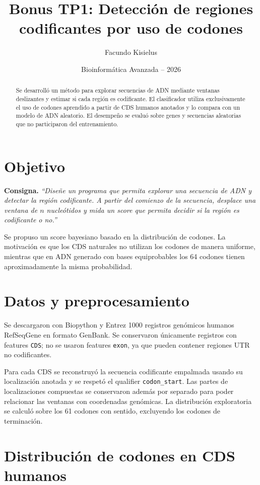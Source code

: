 \documentclass[11pt,a4paper]{article}
\title{Bonus TP1: Detección de regiones codificantes por uso de codones}
\author{Facundo Kisielus}
\date{Bioinformática Avanzada -- 2026}
\begin{document}
\maketitle

\begin{abstract}
Se desarrolló un método para explorar secuencias de ADN mediante ventanas deslizantes y estimar si cada región es codificante. El clasificador utiliza exclusivamente el uso de codones aprendido a partir de CDS humanos anotados y lo compara con un modelo de ADN aleatorio. El desempeño se evaluó sobre genes y secuencias aleatorias que no participaron del entrenamiento.
\end{abstract}

\section{Objetivo}

\textbf{Consigna.} \textit{``Diseñe un programa que permita explorar una secuencia de ADN y detectar la región codificante. A partir del comienzo de la secuencia, desplace una ventana de $n$ nucleótidos y mida un score que permita decidir si la región es codificante o no.''}

Se propuso un score bayesiano basado en la distribución de codones. La motivación es que los CDS naturales no utilizan los codones de manera uniforme, mientras que en ADN generado con bases equiprobables los 64 codones tienen aproximadamente la misma probabilidad.

\section{Datos y preprocesamiento}

Se descargaron con Biopython y Entrez 1000 registros genómicos humanos RefSeqGene en formato GenBank. Se conservaron únicamente registros con features \texttt{CDS}; no se usaron features \texttt{exon}, ya que pueden contener regiones UTR no codificantes.

Para cada CDS se reconstruyó la secuencia codificante empalmada usando su localización anotada y se respetó el qualifier \texttt{codon\_start}. Las partes de localizaciones compuestas se conservaron además por separado para poder relacionar las ventanas con coordenadas genómicas. La distribución exploratoria se calculó sobre los 61 codones con sentido, excluyendo los codones de terminación.

\section{Distribución de codones en CDS humanos}
\end{document}

